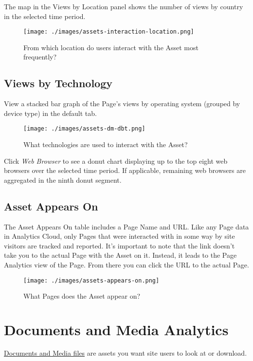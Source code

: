 The map in the Views by Location panel shows the number of views by
country in the selected time period.

\begin{figure}
\centering
\texttt{[image: ./images/assets-interaction-location.png]}
\caption{From which location do users interact with the Asset most
frequently?}
\end{figure}

\subsection{Views by Technology}\label{views-by-technology-1}

View a stacked bar graph of the Page's views by operating system
(grouped by device type) in the default tab.

\begin{figure}
\centering
\texttt{[image: ./images/assets-dm-dbt.png]}
\caption{What technologies are used to interact with the Asset?}
\end{figure}

Click \emph{Web Browser} to see a donut chart displaying up to the top
eight web browsers over the selected time period. If applicable,
remaining web browsers are aggregated in the ninth donut segment.

\subsection{Asset Appears On}\label{asset-appears-on-1}

The Asset Appears On table includes a Page Name and URL. Like any Page
data in Analytics Cloud, only Pages that were interacted with in some
way by site visitors are tracked and reported. It's important to note
that the link doesn't take you to the actual Page with the Asset on it.
Instead, it leads to the Page Analytics view of the Page. From there you
can click the URL to the actual Page.

\begin{figure}
\centering
\texttt{[image: ./images/assets-appears-on.png]}
\caption{What Pages does the Asset appear on?}
\end{figure}

\section{Documents and Media
Analytics}\label{documents-and-media-analytics}

\href{/docs/7-1/user/-/knowledge_base/u/managing-documents-and-media}{Documents
and Media files} are assets you want site users to look at or download.

